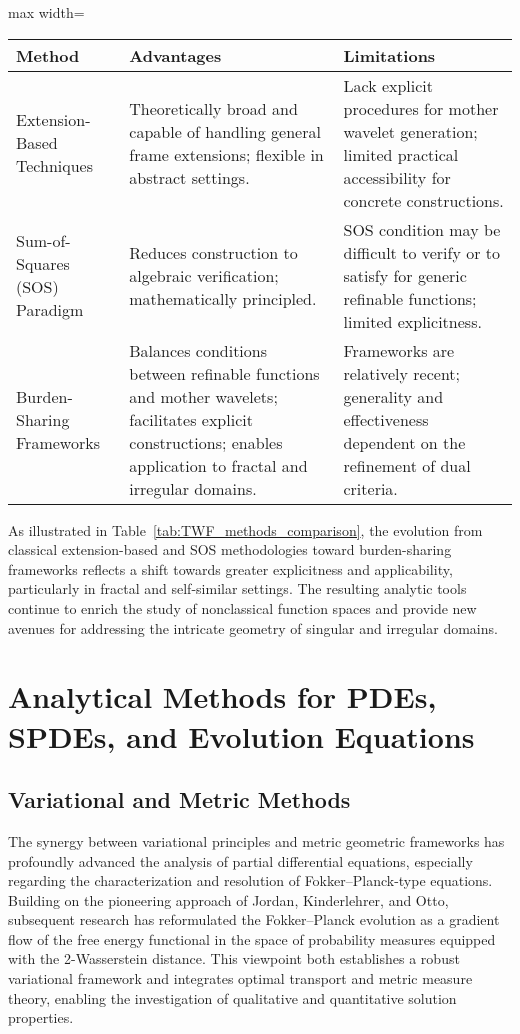 \begin{table*}[htbp]
\centering
\caption{Comparison of Construction Methods for Tight Wavelet Frames (TWFs)}
\label{tab:TWF_methods_comparison}
\begin{adjustbox}{max width=\textwidth}
\begin{tabular}{lll}
\toprule
\textbf{Method} & \textbf{Advantages} & \textbf{Limitations} \\
\midrule
Extension-Based Techniques & Theoretically broad and capable of handling general frame extensions; flexible in abstract settings. & Lack explicit procedures for mother wavelet generation; limited practical accessibility for concrete constructions. \\
Sum-of-Squares (SOS) Paradigm & Reduces construction to algebraic verification; mathematically principled. & SOS condition may be difficult to verify or to satisfy for generic refinable functions; limited explicitness. \\
Burden-Sharing Frameworks & Balances conditions between refinable functions and mother wavelets; facilitates explicit constructions; enables application to fractal and irregular domains. & Frameworks are relatively recent; generality and effectiveness dependent on the refinement of dual criteria. \\
\bottomrule
\end{tabular}
\end{adjustbox}
\end{table*}

As illustrated in Table~\ref{tab:TWF_methods_comparison}, the evolution from classical extension-based and SOS methodologies toward burden-sharing frameworks reflects a shift towards greater explicitness and applicability, particularly in fractal and self-similar settings. The resulting analytic tools continue to enrich the study of nonclassical function spaces and provide new avenues for addressing the intricate geometry of singular and irregular domains.

\section{Analytical Methods for PDEs, SPDEs, and Evolution Equations}

\subsection{Variational and Metric Methods}

The synergy between variational principles and metric geometric frameworks has profoundly advanced the analysis of partial differential equations, especially regarding the characterization and resolution of Fokker–Planck-type equations. Building on the pioneering approach of Jordan, Kinderlehrer, and Otto, subsequent research has reformulated the Fokker–Planck evolution as a gradient flow of the free energy functional in the space of probability measures equipped with the 2-Wasserstein distance. This viewpoint both establishes a robust variational framework and integrates optimal transport and metric measure theory, enabling the investigation of qualitative and quantitative solution properties. 

